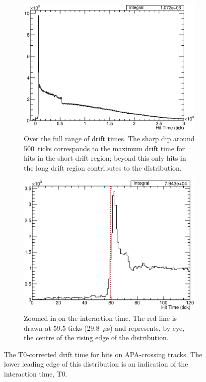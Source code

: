 \begin{figure}
  \centering
  \begin{subfigure}[t]{0.48\linewidth}
    \centering
    \includegraphics[width=\textwidth]{HitTimes.eps}
    \caption{Over the full range of drift times.  The sharp dip around 500~ticks corresponds to the maximum drift time for hits in the short drift region; beyond this only hits in the long drift region contributes to the distribution.}
    \label{fig:HitTimesRange}
  \end{subfigure}
  \hfill
  \begin{subfigure}[t]{0.48\linewidth}
    \centering
    \includegraphics[width=\textwidth]{HitTimesZoom.eps}
    \caption{Zoomed in on the interaction time.  The red line is drawn at 59.5 ticks (29.8~$\mu$s) and represents, by eye, the centre of the rising edge of the distribution.}
    \label{fig:HitTimesZoom}
  \end{subfigure}
  \caption[The T0-corrected drift time for hits on APA-crossing tracks.]{The T0-corrected drift time for hits on APA-crossing tracks.  The lower leading edge of this distribution is an indication of the interaction time, T0.}
  \label{fig:HitTimes}
\end{figure}

